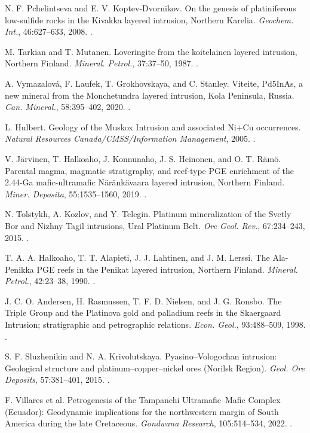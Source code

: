  N. F. Pchelintseva and E. V. Koptev-Dvornikov. On the genesis of platiniferous low-sulfide rocks in the Kivakka layered intrusion, Northern Karelia. \textit{Geochem. Int.}, 46:627--633, 2008. .

 M. Tarkian and T. Mutanen. Loveringite from the koitelainen layered intrusion, Northern Finland. \textit{Mineral. Petrol.}, 37:37--50, 1987. .

 A. Vymazalová, F. Laufek, T. Grokhovskaya, and C. Stanley. Viteite, Pd5InAs, a new mineral from the Monchetundra layered intrusion, Kola Peninsula, Russia. \textit{Can. Mineral.}, 58:395--402, 2020. .

 L. Hulbert. Geology of the Muskox Intrusion and associated Ni+Cu occurrences. \textit{Natural Resources Canada/CMSS/Information Management}, 2005. .

 V. Järvinen, T. Halkoaho, J. Konnunaho, J. S. Heinonen, and O. T. Rämö. Parental magma, magmatic stratigraphy, and reef-type PGE enrichment of the 2.44-Ga mafic-ultramafic Näränkävaara layered intrusion, Northern Finland. \textit{Miner. Deposita}, 55:1535--1560, 2019. .

 N. Tolstykh, A. Kozlov, and Y. Telegin. Platinum mineralization of the Svetly Bor and Nizhny Tagil intrusions, Ural Platinum Belt. \textit{Ore Geol. Rev.}, 67:234--243, 2015. .

 T. A. A. Halkoaho, T. T. Alapieti, J. J. Lahtinen, and J. M. Lerssi. The Ala-Penikka PGE reefs in the Penikat layered intrusion, Northern Finland. \textit{Mineral. Petrol.}, 42:23--38, 1990. .

 J. C. O. Andersen, H. Rasmussen, T. F. D. Nielsen, and J. G. Ronsbo. The Triple Group and the Platinova gold and palladium reefs in the Skaergaard Intrusion; stratigraphic and petrographic relations. \textit{Econ. Geol.}, 93:488--509, 1998. .

 S. F. Sluzhenikin and N. A. Krivolutskaya. Pyasino--Vologochan intrusion: Geological structure and platinum--copper--nickel ores (Norilsk Region). \textit{Geol. Ore Deposits}, 57:381--401, 2015. .

 F. Villares et al. Petrogenesis of the Tampanchi Ultramafic--Mafic Complex (Ecuador): Geodynamic implications for the northwestern margin of South America during the late Cretaceous. \textit{Gondwana Research}, 105:514--534, 2022. .

